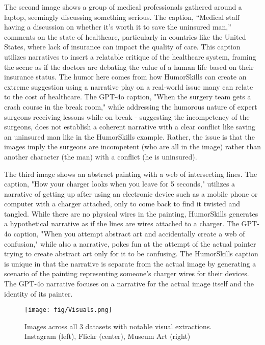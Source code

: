 The second image shows a group of medical professionals gathered around a laptop, seemingly discussing something serious. The caption, “Medical staff having a discussion on whether it’s worth it to save the uninsured man,” comments on the state of healthcare, particularly in countries like the United States, where lack of insurance can impact the quality of care. This caption utilizes narratives to insert a relatable critique of the healthcare system, framing the scene as if the doctors are debating the value of a human life based on their insurance status. The humor here comes from how HumorSkills can create an extreme suggestion using a narrative play on a real-world issue many can relate to the cost of healthcare. The GPT-4o caption, "When the surgery team gets a crash course in the break room," while addressing the humorous nature of expert surgeons receiving lessons while on break - suggesting the incompetency of the surgeons, does not establish a coherent narrative with a clear conflict like saving an uninsured man like in the HumorSkills example. Rather, the issue is that the images imply the surgeons are incompetent (who are all in the image) rather than another character (the man) with a conflict (he is uninsured). 

The third image shows an abstract painting with a web of intersecting lines. The caption, "How your charger looks when you leave for 5 seconds," utilizes a narrative of getting up after using an electronic device such as a mobile phone or computer with a charger attached, only to come back to find it twisted and tangled. While there are no physical wires in the painting, HumorSkills generates a hypothetical narrative as if the lines are wires attached to a charger. The GPT-4o caption, "When you attempt abstract art and accidentally create a web of confusion," while also a narrative, pokes fun at the attempt of the actual painter trying to create abstract art only for it to be confusing. The HumorSkills caption is unique in that the narrative is separate from the actual image by generating a scenario of the painting representing someone's charger wires for their devices. The GPT-4o narrative focuses on a narrative for the actual image itself and the identity of its painter.

\begin{figure*}[h]
    \centering
    \texttt{[image: fig/Visuals.png]}
    \caption{Images across all 3 datasets with notable visual extractions. Instagram (left), Flickr (center), Museum Art (right)}
    \label{fig:visual_system}
\end{figure*}

